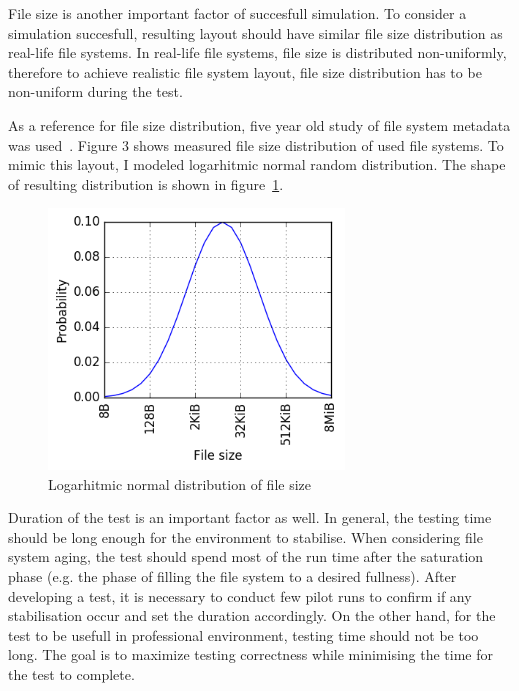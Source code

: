 \documentclass[
  color, %
  table, %
  lof,   %
  lot,   %
]{fithesis3}
\begin{document}
File size is another important factor of succesfull simulation. To consider a simulation succesfull, resulting layout should have similar file size distribution as real-life file systems. In real-life file systems, file size is distributed non-uniformly, therefore to achieve realistic file system layout, file size distribution has to be non-uniform during the test.

As a reference for file size distribution, five year old study of file system metadata was used~\cite{agrawal2007five}. Figure 3 shows measured file size distribution of used file systems. To mimic this layout, I modeled logarhitmic normal random distribution. The shape of resulting distribution is shown in figure~\ref{fig:lognormal}.

\begin{figure}[!htb]
    \begin{minipage}{\textwidth}
        \centering
        \includegraphics[width=0.7\textwidth]{../scripts/dist3.png}
        \caption{Logarhitmic normal distribution of file size}
\label{fig:lognormal}
    \end{minipage}
\end{figure}

Duration of the test is an important factor as well. In general, the testing time should be long enough for the environment to stabilise. When considering file system aging, the test should spend most of the run time after the saturation phase (e.g. the phase of filling the file system to a desired fullness). After developing a test, it is necessary to conduct few pilot runs to confirm if any stabilisation occur and set the duration accordingly. On the other hand, for the test to be usefull in professional environment, testing time should not be too long. The goal is to maximize testing correctness while minimising the time for the test to complete.
\end{document}
